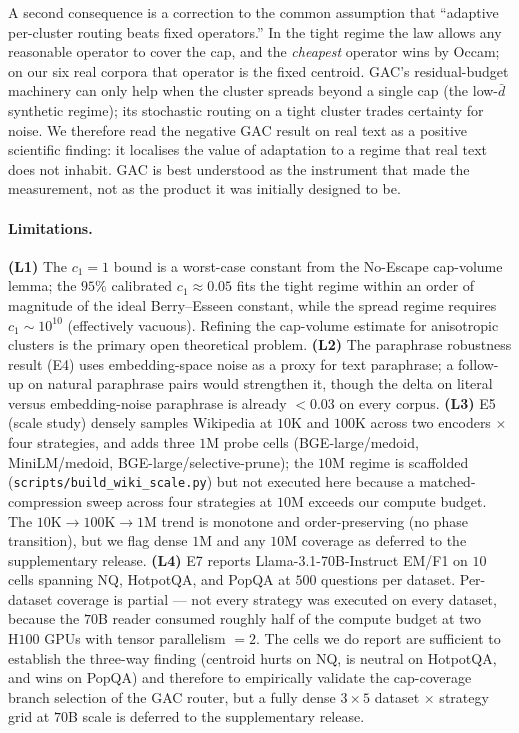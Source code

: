 \documentclass[11pt]{article}
\theoremstyle{definition}
\theoremstyle{remark}
\newcommand{\dbar}{\bar{d}}
\begin{document}
A second consequence is a correction to the common assumption that
``adaptive per-cluster routing beats fixed operators.'' In the tight
regime the law allows any reasonable operator to cover the cap, and
the \emph{cheapest} operator wins by Occam; on our six real corpora
that operator is the fixed centroid. GAC's residual-budget machinery
can only help when the cluster spreads beyond a single cap (the
low-$\dbar$ synthetic regime); its stochastic routing on a tight
cluster trades certainty for noise. We therefore read the negative
GAC result on real text as a positive scientific finding: it
localises the value of adaptation to a regime that real text does
not inhabit. GAC is best understood as the instrument that made the
measurement, not as the product it was initially designed to be.

\paragraph*{Limitations.}
\textbf{(L1)} The $c_1=1$ bound is a worst-case constant from the
No-Escape cap-volume lemma; the $95\%$ calibrated $c_1 \approx 0.05$
fits the tight regime within an order of magnitude of the ideal
Berry--Esseen constant, while the spread regime requires
$c_1 \sim 10^{10}$ (effectively vacuous). Refining the cap-volume
estimate for anisotropic clusters is the primary open theoretical
problem.
\textbf{(L2)} The paraphrase robustness result (E4) uses
embedding-space noise as a proxy for text paraphrase; a follow-up on
natural paraphrase pairs would strengthen it, though the delta on
literal versus embedding-noise paraphrase is already $<0.03$ on every
corpus.
\textbf{(L3)} E5 (scale study) densely samples Wikipedia at $10$K
and $100$K across two encoders $\times$ four strategies, and adds
three $1$M probe cells (BGE-large/medoid, MiniLM/medoid,
BGE-large/selective-prune); the $10$M regime is scaffolded
(\texttt{scripts/build\_wiki\_scale.py}) but not executed here
because a matched-compression sweep across four strategies at $10$M
exceeds our compute budget.  The $10$K$\to$$100$K$\to$$1$M trend is
monotone and order-preserving (no phase transition), but we flag
dense $1$M and any $10$M coverage as deferred to the supplementary
release.
\textbf{(L4)} E7 reports Llama-3.1-70B-Instruct EM/F1 on $10$
cells spanning NQ, HotpotQA, and PopQA at $500$ questions per
dataset.  Per-dataset coverage is partial --- not every strategy was
executed on every dataset, because the $70$B reader consumed roughly
half of the compute budget at two $\mathrm{H}100$ GPUs with tensor
parallelism $=2$.  The cells we do report are sufficient to establish
the three-way finding (centroid hurts on NQ, is neutral on HotpotQA,
and wins on PopQA) and therefore to empirically validate the
cap-coverage branch selection of the GAC router, but a fully dense
$3 \times 5$ dataset $\times$ strategy grid at $70$B scale is
deferred to the supplementary release.
\end{document}
